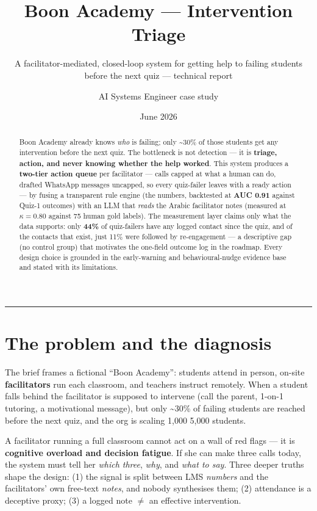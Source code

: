 \documentclass[11pt,paper=a4,parskip=half,DIV=11]{scrartcl}
\title{Boon Academy --- Intervention Triage}
\subtitle{\normalsize\color{black}A facilitator-mediated, closed-loop system for getting help to failing students\\ before the next quiz --- technical report}
\author{AI Systems Engineer case study}
\date{June 2026}
\begin{document}
\maketitle
\thispagestyle{empty}

\begin{abstract}
\noindent Boon Academy already knows \emph{who} is failing; only \textasciitilde30\% of those
students get any intervention before the next quiz. The bottleneck is not detection --- it is
\textbf{triage, action, and never knowing whether the help worked}. This system produces a \textbf{two-tier
action queue} per facilitator --- calls capped at what a human can do, drafted WhatsApp messages
uncapped, so every quiz-failer leaves with a ready action --- by fusing a transparent rule engine
(the numbers, backtested at \textbf{AUC 0.91} against Quiz-1 outcomes) with an LLM that
\emph{reads} the Arabic facilitator notes (measured at \(\kappa=0.80\) against 75 human gold
labels). The measurement layer claims only what the data supports: only \textbf{44\%} of
quiz-failers have any logged contact since the quiz, and of the contacts that exist, just 11\%
were followed by re-engagement --- a descriptive gap (no control group) that motivates the
one-field outcome log in the roadmap. Every design choice is grounded in the early-warning and
behavioural-nudge evidence base and stated with its limitations.
\end{abstract}

\tableofcontents
\bigskip\hrule

\section{The problem and the diagnosis}
The brief frames a fictional ``Boon Academy'': students attend in person, on-site
\textbf{facilitators} run each classroom, and teachers instruct remotely. When a student falls
behind the facilitator is supposed to intervene (call the parent, 1-on-1 tutoring, a motivational
message), but only \textasciitilde30\% of failing students are reached before the next quiz, and
the org is scaling 1{,}000\,\textrightarrow\,5{,}000 students.

\begin{insight}
A facilitator running a full classroom cannot act on a wall of red flags --- it is \textbf{cognitive
overload and decision fatigue}. If she can make three calls today, the system must tell her
\emph{which three}, \emph{why}, and \emph{what to say}. Three deeper truths shape the design:
(1) the signal is split between LMS \emph{numbers} and the facilitators' own free-text \emph{notes},
and nobody synthesises them; (2) attendance is a deceptive proxy; (3) a logged note $\neq$ an
effective intervention.
\end{insight}
\end{document}
